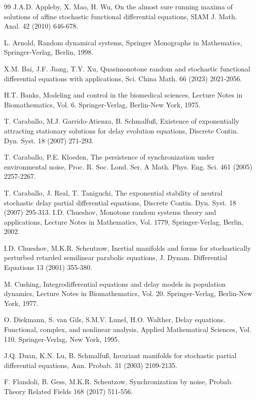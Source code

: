 \documentclass[preprint,12pt]{elsarticle}
\begin{document}
\begin{thebibliography}{99}
 J.A.D. Appleby, X. Mao, H. Wu, On the almost sure running maxima of solutions of affine stochastic functional differential equations, SIAM J. Math. Anal. 42 (2010) 646-678.

 L. Arnold, Random dynamical systems, Springer Monographs in Mathematics,
Springer-Verlag, Berlin, 1998.

 X.M. Bai, J.F. Jiang, T.Y. Xu, Quasimonotone random and stochastic functional differential equations with applications, Sci. China Math. 66 (2023) 2021-2056.

 H.T. Banks, Modeling and control in the biomedical sciences, Lecture Notes in Biomathematics, Vol. 6. Springer-Verlag, Berlin-New York, 1975.

 T. Caraballo, M.J. Garrido-Atienza, B. Schmalfu{\ss}, Existence of exponentially attracting stationary solutions for delay evolution equations,
Discrete Contin. Dyn. Syst. 18 (2007) 271-293.

 T. Caraballo, P.E. Kloeden, The persistence of synchronization under environmental noise, Proc. R. Soc. Lond. Ser. A Math. Phys. Eng. Sci. 461 (2005) 2257-2267.

 T. Caraballo, J. Real, T. Taniguchi, The exponential stability of neutral stochastic delay partial differential equations, Discrete Contin. Dyn. Syst. 18 (2007) 295-313.
 I.D. Chueshov, Monotone random systems theory and applications, Lecture
Notes in Mathematics, Vol. 1779, Springer-Verlag, Berlin, 2002.

 I.D. Chueshov, M.K.R. Scheutzow, Inertial manifolds and forms for stochastically perturbed retarded semilinear parabolic equations, J. Dynam. Differential Equations 13 (2001) 355-380.

 M. Cushing, Integrodifferential equations and delay models in population dynamics,
Lecture Notes in Biomathematics, Vol. 20. Springer-Verlag, Berlin-New York, 1977.

 O. Diekmann, S. van Gils, S.M.V. Lunel, H.O. Walther, Delay equations. Functional, complex, and nonlinear analysis, Applied Mathematical Sciences, Vol. 110. Springer-Verlag, New York, 1995.

  J.Q. Duan, K.N. Lu, B. Schmalfu{\ss}, Invariant manifolds for stochastic partial differential equations, Ann. Probab. 31 (2003) 2109-2135.

 F. Flandoli, B. Gess, M.K.R. Scheutzow, Synchronization by noise, Probab. Theory Related Fields 168 (2017) 511-556.


\end{thebibliography}
\end{document}
